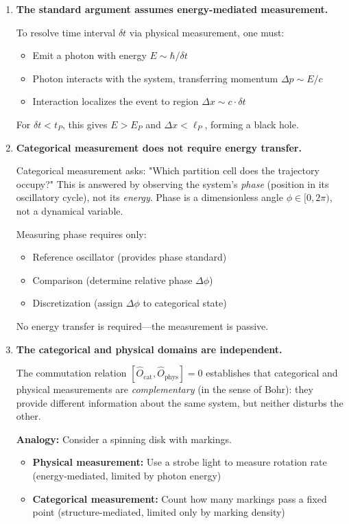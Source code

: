 \documentclass[twocolumn,10pt]{article}
\theoremstyle{remark}
\begin{document}
\begin{enumerate}
    \item \textbf{The standard argument assumes energy-mediated measurement.}
    
    To resolve time interval $\delta t$ via physical measurement, one must:
    \begin{itemize}
        \item Emit a photon with energy $E \sim \hbar/\delta t$
        \item Photon interacts with the system, transferring momentum $\Delta p \sim E/c$
        \item Interaction localizes the event to region $\Delta x \sim c \cdot \delta t$
    \end{itemize}
    
    For $\delta t < t_P$, this gives $E > E_P$ and $\Delta x < \ell_P$, forming a black hole.
    
    \item \textbf{Categorical measurement does not require energy transfer.}
    
    Categorical measurement asks: "Which partition cell does the trajectory occupy?" This is answered by observing the system's \textit{phase} (position in its oscillatory cycle), not its \textit{energy}. Phase is a dimensionless angle $\phi \in [0, 2\pi)$, not a dynamical variable.
    
    Measuring phase requires only:
    \begin{itemize}
        \item Reference oscillator (provides phase standard)
        \item Comparison (determine relative phase $\Delta \phi$)
        \item Discretization (assign $\Delta \phi$ to categorical state)
    \end{itemize}
    
    No energy transfer is required—the measurement is passive.
    
    \item \textbf{The categorical and physical domains are independent.}
    
    The commutation relation $[\hat{O}_{\text{cat}}, \hat{O}_{\text{phys}}] = 0$ establishes that categorical and physical measurements are \textit{complementary} (in the sense of Bohr): they provide different information about the same system, but neither disturbs the other.
    
    \textbf{Analogy:} Consider a spinning disk with markings.
    \begin{itemize}
        \item \textbf{Physical measurement:} Use a strobe light to measure rotation rate (energy-mediated, limited by photon energy)
        \item \textbf{Categorical measurement:} Count how many markings pass a fixed point (structure-mediated, limited only by marking density)
    \end{itemize}
    

\end{enumerate}
\end{document}
